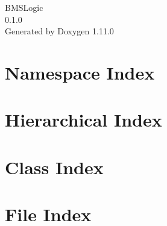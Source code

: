 \documentclass[twoside]{book}
\newcommand{\+}{\discretionary{\mbox{\scriptsize$\hookleftarrow$}}{}{}}
\newcommand{\clearemptydoublepage}{%
    \newpage{\pagestyle{empty}\cleardoublepage}%
  }
\begin{document}
  \raggedbottom
    \hypersetup{pageanchor=false,
                bookmarksnumbered=true,
                pdfencoding=unicode
               }
  \begin{titlepage}
  \vspace*{7cm}
  \begin{center}%
  {\Large BMSLogic}\\
  [1ex]\large 0.\+1.\+0 \\
  \vspace*{1cm}
  {\large Generated by Doxygen 1.11.0}\\
  \end{center}
  \end{titlepage}
  \clearemptydoublepage
  \tableofcontents
  \clearemptydoublepage
  \hypersetup{pageanchor=true}
\chapter{Namespace Index}

\chapter{Hierarchical Index}

\chapter{Class Index}

\chapter{File Index}

\end{document}
